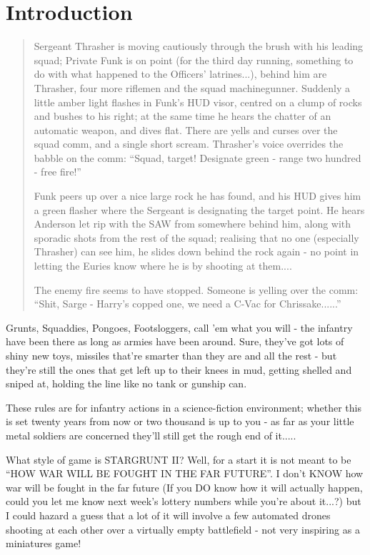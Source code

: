 \chapter{Introduction}
\begin{quotation}
\begin{itshape}
Sergeant Thrasher is moving cautiously through the brush with his leading squad; Private Funk is on point (for the third day running, something to do with what happened to the Officers' latrines...), behind him are Thrasher, four more riflemen and the squad machinegunner. Suddenly a little amber light flashes in Funk's HUD visor, centred on a clump of rocks and bushes to his right; at the same time he hears the chatter of an automatic weapon, and dives flat. There are yells and curses over the squad comm, and a single short scream. Thrasher's voice overrides the babble on the comm: ``Squad, target! Designate green - range two hundred - free fire!''

Funk peers up over a nice large rock he has found, and his HUD gives him a green flasher where the Sergeant is designating the target point. He hears Anderson let rip with the SAW from somewhere behind him, along with sporadic shots from the rest of the squad; realising that no one (especially Thrasher) can see him, he slides down behind the rock again - no point in letting the Euries know where he is by shooting at them....

The enemy fire seems to have stopped. Someone is yelling over the comm: ``Shit, Sarge - Harry's copped one, we need a C-Vac for Chrissake......'' 
\end{itshape}
\end{quotation}

Grunts, Squaddies, Pongoes, Footsloggers, call 'em what you will - the infantry have been there as long as armies have been around. Sure, they've got lots of shiny new toys, missiles that're smarter than they are and all the rest - but they're still the ones that get left up to their knees in mud, getting shelled and sniped at, holding the line like no tank or gunship can.

These rules are for infantry actions in a science-fiction environment; whether this is set twenty years from now or two thousand is up to you - as far as your little metal soldiers are concerned they'll still get the rough end of it..... 

What style of game is STARGRUNT II? Well, for a start it is not meant to be ``HOW WAR WILL BE FOUGHT IN THE FAR FUTURE''. I don't KNOW how war will be fought in the far future (If you DO know how it will actually happen, could you let me know next week's lottery numbers while you're about it...?) but I could hazard a guess that a lot of it will involve a few automated drones shooting at each other over a virtually empty battlefield - not very inspiring as a miniatures game!

